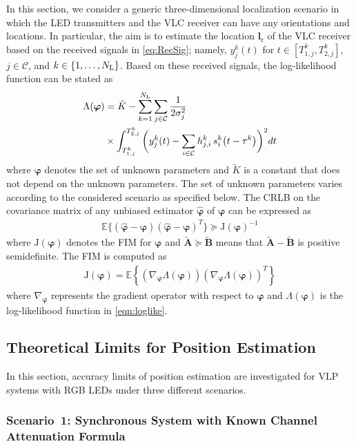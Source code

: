 \documentclass[10pt,twocolumn]{IEEEtran}
\newcommand{\NL}{N_{\rm{L}}}
\newcommand{\bvp}{{\boldsymbol{\varphi}}}
\newcommand{\bvphat}{{\hat{\bvp}}}
\newcommand{\mtC}{{\mathcal{C}}}
\newcommand{\expectation}{{\mathbb{E}}}
\newcommand{\lr}{{\boldsymbol{l}_{\mathrm{r}}}}
\newcommand{\Jv}{{\boldsymbol{\mathrm{J}}(\bvp)}}
\begin{document}
In this section, we consider a generic three-dimensional localization scenario in which the LED transmitters and the VLC receiver can have any orientations and locations. In particular, the aim is to estimate the location $\lr$ of the VLC receiver based on the received signals in \eqref{eq:RecSig}; namely, $y^k_j(t)$ for $t\in[T^k_{1,j},T^k_{2,j}]$, $j\in\mtC$, and $k\in\{1,\ldots,\NL\}$. Based on these received signals, the log-likelihood function can be stated as
\begin{align}\nonumber
\Lambda (\bvp) &= \tilde{K} -
\sum_{k=1}^{\NL}\sum_{j\in\mtC}\frac{1}{2\sigma_j^2}
\\\label{eqn:loglike}
&\times\int_{T^k_{1,j}}^{T^k_{2,j}}\bigg(y^k_j(t)-\sum_{i\in\mtC}h^k_{j,i}\,s^k_i\big(t-\tau^k\big)\bigg)^2dt
\end{align}
where $\bvp$ denotes the set of unknown parameters and $\tilde{K}$ is a constant that does not depend on the unknown parameters. The set of unknown parameters varies according to the considered scenario as specified below. The CRLB on the covariance matrix of any unbiased estimator $\hat{\bvp}$ of $\bvp$ can be expressed as
\cite{Poor}
\begin{gather}\label{crlb_expression}
\expectation \big\{ ( \bvphat - \bvp  ) ( \bvphat - \bvp  )^T \big\} \succeq \Jv^{-1}
\end{gather}
where $\Jv$ denotes the FIM for $\bvp$ and $\tilde{\boldsymbol{A}} \succeq \tilde{\boldsymbol{B}}$ means that $\tilde{\boldsymbol{A}} - \tilde{\boldsymbol{B}}$ is positive semidefinite. The FIM is computed as
\begin{gather}\label{eq:fim}
\Jv = \expectation \left\{ \left(  \nabla_{\bvp} \Lambda(\bvp) \right) \left( \nabla_{\bvp} \Lambda(\bvp) \right)^T \right\}
\end{gather}
where $\nabla_{\bvp}$ represents the gradient operator with respect to $\bvp$ and $\Lambda(\bvp)$ is the log-likelihood function in \eqref{eqn:loglike}.


\subsection{Theoretical Limits for Position Estimation}\label{sec:LimitsPos}

In this section, accuracy limits of position estimation are investigated for VLP systems with RGB LEDs under three different scenarios.

\subsubsection{Scenario~1: Synchronous System with Known Channel Attenuation Formula}\label{sec:Case1pos}
\end{document}
